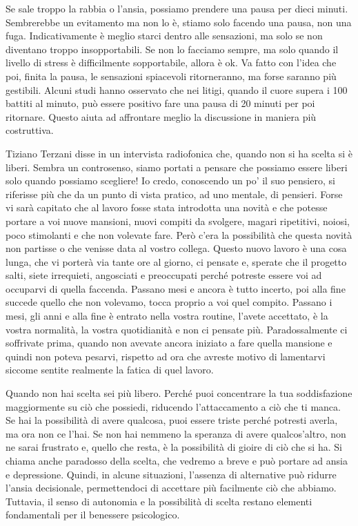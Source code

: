 \documentclass[12pt]{book} %
\begin{document}
Se sale troppo la rabbia o l'ansia, possiamo prendere una pausa per dieci minuti. Sembrerebbe un evitamento ma non lo è,
stiamo solo facendo una pausa, non una fuga. Indicativamente è meglio starci dentro alle sensazioni, ma solo se non
diventano troppo insopportabili. Se non lo facciamo sempre, ma solo quando il livello di stress è difficilmente
sopportabile, allora è ok. Va fatto con l'idea che poi, finita la pausa, le sensazioni spiacevoli ritorneranno, ma
forse saranno più gestibili. Alcuni studi hanno osservato che nei litigi, quando il cuore supera i 100 battiti al
minuto, può essere positivo fare una pausa di 20 minuti per poi ritornare. Questo aiuta ad affrontare meglio la
discussione in maniera più costruttiva. 

Tiziano Terzani disse in un intervista radiofonica che, quando non si ha scelta si è liberi. Sembra un controsenso,
siamo portati a pensare che possiamo essere liberi solo quando possiamo scegliere! Io credo, conoscendo un
po' il suo pensiero, si riferisse più che da un punto di vista pratico, ad uno mentale, di
pensieri. Forse vi sarà capitato che al lavoro fosse stata introdotta una novità e che potesse portare a voi nuove
mansioni, nuovi compiti da svolgere, magari ripetitivi, noiosi, poco stimolanti e che non volevate fare. Però
c'era la possibilità che questa novità non partisse o che venisse data al vostro collega. Questo
nuovo lavoro è una cosa lunga, che vi porterà via tante ore al giorno, ci pensate e, sperate che il progetto salti,
siete irrequieti, angosciati e preoccupati perché potreste essere voi ad occuparvi di quella faccenda. Passano mesi e
ancora è tutto incerto, poi alla fine succede quello che non volevamo, tocca proprio a voi quel compito. Passano i
mesi, gli anni e alla fine è entrato nella vostra routine, l'avete accettato, è la vostra
normalità, la vostra quotidianità e non ci pensate più. Paradossalmente ci soffrivate prima, quando non avevate ancora
iniziato a fare quella mansione e quindi non poteva pesarvi, rispetto ad ora che avreste motivo di lamentarvi siccome
sentite realmente la fatica di quel lavoro.

Quando non hai scelta sei più libero. Perché puoi concentrare la tua soddisfazione maggiormente su ciò che possiedi, riducendo l'attaccamento a ciò che ti manca. Se hai la possibilità di avere qualcosa, puoi essere triste perché potresti averla, ma ora non ce l'hai. Se
non hai nemmeno la speranza di avere qualcos'altro, non ne sarai frustrato e, quello che resta, è la possibilità di gioire di ciò
che si ha. Si chiama anche paradosso della scelta, che vedremo a breve e può portare ad ansia e depressione.
Quindi, in alcune situazioni, l’assenza di alternative può ridurre l’ansia decisionale, permettendoci di accettare più facilmente ciò che abbiamo. Tuttavia, il senso di autonomia e la possibilità di scelta restano elementi fondamentali per il benessere psicologico.
\end{document}
